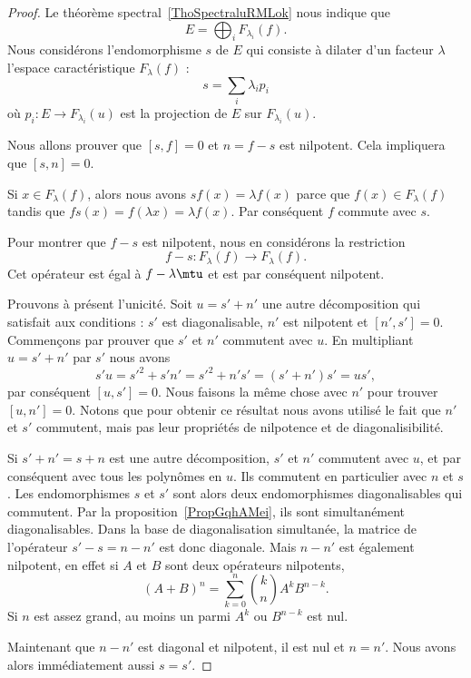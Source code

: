 \begin{proof}
    Le théorème spectral~\ref{ThoSpectraluRMLok} nous indique que
    \begin{equation}
        E=\bigoplus_iF_{\lambda_i}(f).
    \end{equation}
    Nous considérons l'endomorphisme \( s\) de \( E\) qui consiste à dilater d'un facteur \( \lambda\) l'espace caractéristique \( F_{\lambda}(f)\) :
    \begin{equation}
        s=\sum_i\lambda_ip_i
    \end{equation}
    où \( p_i\colon E\to F_{\lambda_i}(u)\) est la projection de \( E\) sur \( F_{\lambda_i}(u)\).

    Nous allons prouver que \( [s,f]=0\) et \( n=f-s\) est nilpotent. Cela impliquera que \( [s,n]=0\).

    Si \( x\in F_{\lambda}(f)\), alors nous avons \( sf(x)=\lambda f(x)\) parce que \( f(x)\in F_{\lambda}(f)\) tandis que \( fs(x)=f(\lambda x)=\lambda f(x)\). Par conséquent \( f\) commute avec \( s\).

    Pour montrer que \( f-s\) est nilpotent, nous en considérons la restriction
    \begin{equation}
        f-s\colon F_{\lambda}(f)\to F_{\lambda}(f).
    \end{equation}
    Cet opérateur est égal à \( f-\lambda\mtu\) et est par conséquent nilpotent.

    Prouvons à présent l'unicité. Soit \( u=s'+n'\) une autre décomposition qui satisfait aux conditions : \( s'\) est diagonalisable, \( n'\) est nilpotent et \( [n',s']=0\). Commençons par prouver que \( s'\) et \( n'\) commutent avec \( u\). En multipliant \( u=s'+n'\) par \( s'\) nous avons
    \begin{equation}
        s'u=s'^2+s'n'=s'^2+n's'=(s'+n')s'=us',
    \end{equation}
    par conséquent \( [u,s']=0\). Nous faisons la même chose avec \( n'\) pour trouver \( [u,n']=0\). Notons que pour obtenir ce résultat nous avons utilisé le fait que \( n'\) et \( s'\) commutent, mais pas leur propriétés de nilpotence et de diagonalisibilité.


    Si \( s'+n'=s+n\) est une autre décomposition, \( s'\) et \( n'\) commutent avec \( u\), et par conséquent avec tous les polynômes en \( u\). Ils commutent en particulier avec \( n\) et \( s\). Les endomorphismes \( s\) et \( s'\) sont alors deux endomorphismes diagonalisables qui commutent. Par la proposition~\ref{PropGqhAMei}, ils sont simultanément diagonalisables. Dans la base de diagonalisation simultanée, la matrice de l'opérateur \( s'-s=n-n'\) est donc diagonale. Mais \( n-n'\) est également nilpotent, en effet si \( A\) et \( B\) sont deux opérateurs nilpotents,
    \begin{equation}
        (A+B)^n=\sum_{k=0}^n\binom{k}{n}A^kB^{n-k}.
    \end{equation}
    Si \( n\) est assez grand, au moins un parmi \( A^k\) ou \( B^{n-k}\) est nul.

    Maintenant que \( n-n'\) est diagonal et nilpotent, il est nul et \( n=n'\). Nous avons alors immédiatement aussi \( s=s'\).

\end{proof}

